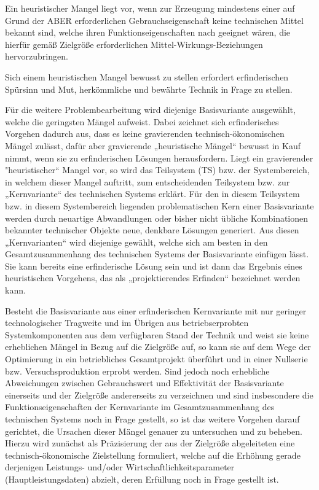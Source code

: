 \documentclass[12pt,a4paper]{article}
\begin{document}
Ein heuristischer Mangel liegt vor, wenn zur Erzeugung mindestens einer auf
Grund der ABER erforderlichen Gebrauchseigenschaft keine technischen Mittel
bekannt sind, welche ihren Funktionseigenschaften nach geeignet wären, die
hierfür gemäß Zielgröße erforderlichen Mittel-Wirkungs-Beziehungen
hervorzubringen.

Sich einem heuristischen Mangel bewusst zu stellen erfordert erfinderischen
Spürsinn und Mut, herkömmliche und bewährte Technik in Frage zu stellen.

Für die weitere Problembearbeitung wird diejenige Basisvariante ausgewählt,
welche die geringsten Mängel aufweist. Dabei zeichnet sich erfinderisches
Vorgehen dadurch aus, dass es keine gravierenden technisch-ökonomischen Mängel
zulässt, dafür aber gravierende „heuristische Mängel“ bewusst in Kauf nimmt,
wenn sie zu erfinderischen Lösungen herausfordern. Liegt ein gravierender
"heuristischer“ Mangel vor, so wird das Teilsystem (TS) bzw. der
Systembereich, in welchem dieser Mangel auftritt, zum entscheidenden
Teilsystem bzw. zur „Kernvariante“ des technischen Systems erklärt. Für den in
diesem Teilsystem bzw. in diesem Systembereich liegenden problematischen Kern
einer Basisvariante werden durch neuartige Abwandlungen oder bisher nicht
übliche Kombinationen bekannter technischer Objekte neue, denkbare Lösungen
generiert. Aus diesen „Kernvarianten“ wird diejenige gewählt, welche sich am
besten in den Gesamtzusammenhang des technischen Systems der Basisvariante
einfügen lässt. Sie kann bereits eine erfinderische Lösung sein und ist dann
das Ergebnis eines heuristischen Vorgehens, das als „projektierendes Erfinden“
bezeichnet werden kann.

Besteht die Basisvariante aus einer erfinderischen Kernvariante mit nur
geringer technologischer Tragweite und im Übrigen aus betriebserprobten
Systemkomponenten aus dem verfügbaren Stand der Technik und weist sie keine
erheblichen Mängel in Bezug auf die Zielgröße auf, so kann sie auf dem Wege
der Optimierung in ein betriebliches Gesamtprojekt überführt und in einer
Nullserie bzw. Versuchsproduktion erprobt werden. Sind jedoch noch erhebliche
Abweichungen zwischen Gebrauchswert und Effektivität der Basisvariante
einerseits und der Zielgröße andererseits zu verzeichnen und sind insbesondere
die Funktionseigenschaften der Kernvariante im Gesamtzusammenhang des
technischen Systems noch in Frage gestellt, so ist das weitere Vorgehen darauf
gerichtet, die Ursachen dieser Mängel genauer zu untersuchen und zu
beheben. Hierzu wird zunächst als Präzisierung der aus der Zielgröße
abgeleiteten eine technisch-ökonomische Zielstellung formuliert, welche auf
die Erhöhung gerade derjenigen Leistungs- und/oder
Wirtschaftlichkeitsparameter (Hauptleistungsdaten) abzielt, deren Erfüllung
noch in Frage gestellt ist.
\end{document}
